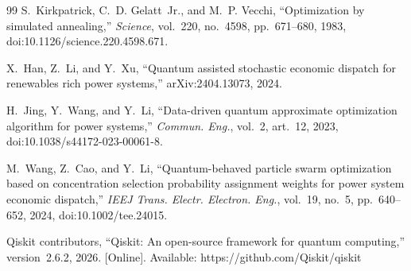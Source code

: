 \begin{thebibliography}{99}
 S.~Kirkpatrick, C.~D. Gelatt~Jr., and M.~P. Vecchi, ``Optimization by simulated annealing,'' \emph{Science}, vol.~220, no.~4598, pp.~671--680, 1983, doi:10.1126/science.220.4598.671.

 X.~Han, Z.~Li, and Y.~Xu, ``Quantum assisted stochastic economic dispatch for renewables rich power systems,'' arXiv:2404.13073, 2024.

 H.~Jing, Y.~Wang, and Y.~Li, ``Data-driven quantum approximate optimization algorithm for power systems,'' \emph{Commun. Eng.}, vol.~2, art.~12, 2023, doi:10.1038/s44172-023-00061-8.

 M.~Wang, Z.~Cao, and Y.~Li, ``Quantum-behaved particle swarm optimization based on concentration selection probability assignment weights for power system economic dispatch,'' \emph{IEEJ Trans. Electr. Electron. Eng.}, vol.~19, no.~5, pp.~640--652, 2024, doi:10.1002/tee.24015.

 Qiskit contributors, ``Qiskit: An open-source framework for quantum computing,'' version~2.6.2, 2026. [Online]. Available: https://github.com/Qiskit/qiskit

\end{thebibliography}
